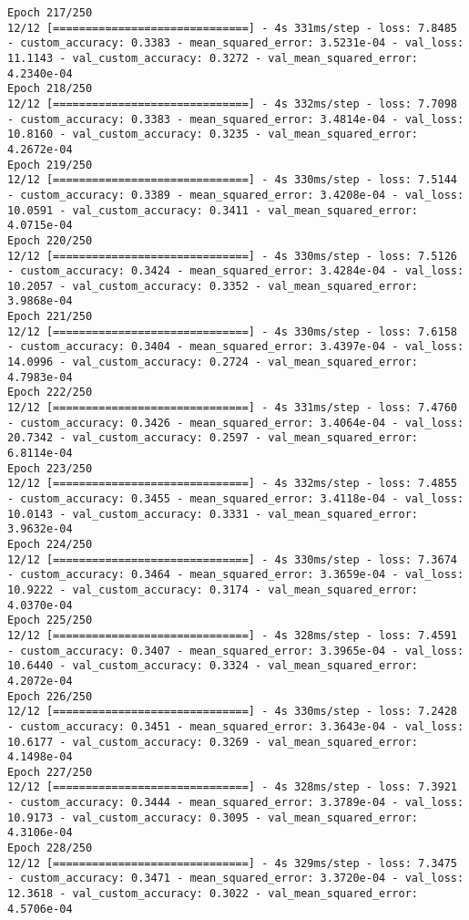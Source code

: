 \begin{lstlisting}
Epoch 217/250
12/12 [==============================] - 4s 331ms/step - loss: 7.8485 - custom_accuracy: 0.3383 - mean_squared_error: 3.5231e-04 - val_loss: 11.1143 - val_custom_accuracy: 0.3272 - val_mean_squared_error: 4.2340e-04
Epoch 218/250
12/12 [==============================] - 4s 332ms/step - loss: 7.7098 - custom_accuracy: 0.3383 - mean_squared_error: 3.4814e-04 - val_loss: 10.8160 - val_custom_accuracy: 0.3235 - val_mean_squared_error: 4.2672e-04
Epoch 219/250
12/12 [==============================] - 4s 330ms/step - loss: 7.5144 - custom_accuracy: 0.3389 - mean_squared_error: 3.4208e-04 - val_loss: 10.0591 - val_custom_accuracy: 0.3411 - val_mean_squared_error: 4.0715e-04
Epoch 220/250
12/12 [==============================] - 4s 330ms/step - loss: 7.5126 - custom_accuracy: 0.3424 - mean_squared_error: 3.4284e-04 - val_loss: 10.2057 - val_custom_accuracy: 0.3352 - val_mean_squared_error: 3.9868e-04
Epoch 221/250
12/12 [==============================] - 4s 330ms/step - loss: 7.6158 - custom_accuracy: 0.3404 - mean_squared_error: 3.4397e-04 - val_loss: 14.0996 - val_custom_accuracy: 0.2724 - val_mean_squared_error: 4.7983e-04
Epoch 222/250
12/12 [==============================] - 4s 331ms/step - loss: 7.4760 - custom_accuracy: 0.3426 - mean_squared_error: 3.4064e-04 - val_loss: 20.7342 - val_custom_accuracy: 0.2597 - val_mean_squared_error: 6.8114e-04
Epoch 223/250
12/12 [==============================] - 4s 332ms/step - loss: 7.4855 - custom_accuracy: 0.3455 - mean_squared_error: 3.4118e-04 - val_loss: 10.0143 - val_custom_accuracy: 0.3331 - val_mean_squared_error: 3.9632e-04
Epoch 224/250
12/12 [==============================] - 4s 330ms/step - loss: 7.3674 - custom_accuracy: 0.3464 - mean_squared_error: 3.3659e-04 - val_loss: 10.9222 - val_custom_accuracy: 0.3174 - val_mean_squared_error: 4.0370e-04
Epoch 225/250
12/12 [==============================] - 4s 328ms/step - loss: 7.4591 - custom_accuracy: 0.3407 - mean_squared_error: 3.3965e-04 - val_loss: 10.6440 - val_custom_accuracy: 0.3324 - val_mean_squared_error: 4.2072e-04
Epoch 226/250
12/12 [==============================] - 4s 330ms/step - loss: 7.2428 - custom_accuracy: 0.3451 - mean_squared_error: 3.3643e-04 - val_loss: 10.6177 - val_custom_accuracy: 0.3269 - val_mean_squared_error: 4.1498e-04
Epoch 227/250
12/12 [==============================] - 4s 328ms/step - loss: 7.3921 - custom_accuracy: 0.3444 - mean_squared_error: 3.3789e-04 - val_loss: 10.9173 - val_custom_accuracy: 0.3095 - val_mean_squared_error: 4.3106e-04
Epoch 228/250
12/12 [==============================] - 4s 329ms/step - loss: 7.3475 - custom_accuracy: 0.3471 - mean_squared_error: 3.3720e-04 - val_loss: 12.3618 - val_custom_accuracy: 0.3022 - val_mean_squared_error: 4.5706e-04

\end{lstlisting}

